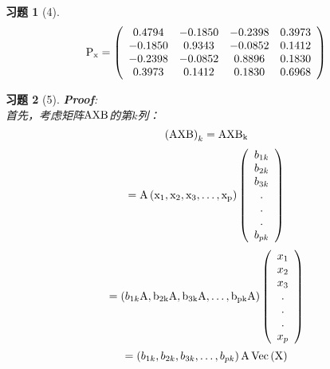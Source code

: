 \documentclass[12pt, oneside]{article}
\newtheorem*{exercise}{\textbf{习题}}
\begin{document}
  \begin{exercise}[4]
	\scriptsize
	\begin{equation*}
	  \rm{
		P_x = \left(
		\begin{array}{cccc}
		  0.4794 & -0.1850 & -0.2398 & 0.3973 \\
		  -0.1850 & 0.9343 & -0.0852 & 0.1412 \\
		  -0.2398 & -0.0852 & 0.8896 & 0.1830 \\
		  0.3973 & 0.1412 & 0.1830 & 0.6968 \\
		\end{array}
		\right)
	  }
	\end{equation*}
  \end{exercise}

  \begin{exercise}[5]
	\rm{
	  \textbf{Proof}:\\
	  首先，考虑矩阵$\rm{AXB}$的第$k$列：
	  \begin{equation*}
		\left( \rm{AXB} \right)_k = \rm{AXB}_k
	  \end{equation*}
	  \begin{equation*}
		= \rm{A} \left( x_1, x_2, x_3, \dots , x_p \right)
		\left(
		\begin{array}{c}
		  b_{1k} \\
		  b_{2k} \\
		  b_{3k} \\
		  . \\
		  . \\
		  . \\
		  b_{pk} \\
		\end{array}
		\right)
	  \end{equation*}
	  \begin{equation*}
		= \left( b_{1k}\rm{A}, b_{2k}\rm{A}, b_{3k}\rm{A}, \dots , b_{pk}\rm{A}\right) \left( 
		\begin{array}{c}
		  x_1 \\
		  x_2 \\
		  x_3 \\
		  . \\
		  . \\
		  . \\
		  x_p \\
		\end{array}
		\right)
		\end{equation*}
		\begin{equation*}
		  = \left( b_{1k}, b_{2k}, b_{3k}, \dots , b_{pk}\right)\rm{A}\operatorname{Vec}\left( \rm{X} \right)

\end{equation*}}
\end{exercise}
\end{document}
